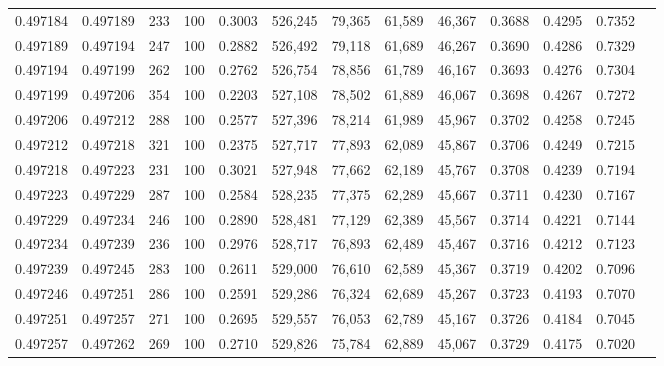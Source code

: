 \begin{tabular}{rrrrrrrrrrrrr}
0.497184 & 0.497189 &   233 & 100 &                                     0.3003 & 526,245 &  79,365 &  61,589 &  46,367 & 0.3688 & 0.4295 & 0.7352 \\
0.497189 & 0.497194 &   247 & 100 &                                     0.2882 & 526,492 &  79,118 &  61,689 &  46,267 & 0.3690 & 0.4286 & 0.7329 \\
0.497194 & 0.497199 &   262 & 100 &                                     0.2762 & 526,754 &  78,856 &  61,789 &  46,167 & 0.3693 & 0.4276 & 0.7304 \\
0.497199 & 0.497206 &   354 & 100 &                                     0.2203 & 527,108 &  78,502 &  61,889 &  46,067 & 0.3698 & 0.4267 & 0.7272 \\
0.497206 & 0.497212 &   288 & 100 &                                     0.2577 & 527,396 &  78,214 &  61,989 &  45,967 & 0.3702 & 0.4258 & 0.7245 \\
0.497212 & 0.497218 &   321 & 100 &                                     0.2375 & 527,717 &  77,893 &  62,089 &  45,867 & 0.3706 & 0.4249 & 0.7215 \\
0.497218 & 0.497223 &   231 & 100 &                                     0.3021 & 527,948 &  77,662 &  62,189 &  45,767 & 0.3708 & 0.4239 & 0.7194 \\
0.497223 & 0.497229 &   287 & 100 &                                     0.2584 & 528,235 &  77,375 &  62,289 &  45,667 & 0.3711 & 0.4230 & 0.7167 \\
0.497229 & 0.497234 &   246 & 100 &                                     0.2890 & 528,481 &  77,129 &  62,389 &  45,567 & 0.3714 & 0.4221 & 0.7144 \\
0.497234 & 0.497239 &   236 & 100 &                                     0.2976 & 528,717 &  76,893 &  62,489 &  45,467 & 0.3716 & 0.4212 & 0.7123 \\
0.497239 & 0.497245 &   283 & 100 &                                     0.2611 & 529,000 &  76,610 &  62,589 &  45,367 & 0.3719 & 0.4202 & 0.7096 \\
0.497246 & 0.497251 &   286 & 100 &                                     0.2591 & 529,286 &  76,324 &  62,689 &  45,267 & 0.3723 & 0.4193 & 0.7070 \\
0.497251 & 0.497257 &   271 & 100 &                                     0.2695 & 529,557 &  76,053 &  62,789 &  45,167 & 0.3726 & 0.4184 & 0.7045 \\
0.497257 & 0.497262 &   269 & 100 &                                     0.2710 & 529,826 &  75,784 &  62,889 &  45,067 & 0.3729 & 0.4175 & 0.7020 \\

\end{tabular}
